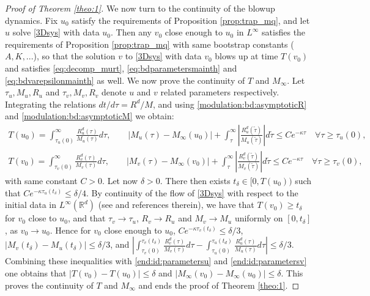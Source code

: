 \documentclass[11pt]{aims}
\theoremstyle{definition}
\numberwithin{equation}{section}
\begin{document}
\begin{proof}[Proof of Theorem \ref{theo:1}]
We now turn to the continuity of the blowup dynamics. Fix $u_0$ satisfy the requirements of Proposition \ref{prop:trap_mq}, and let $u$ solve \eqref{3Dsys} with data $u_0$. Then any $v_0$ close enough to $u_0$ in $L^\infty$ satisfies the requirements of Proposition \ref{prop:trap_mq} with same bootstrap constants ($A,K,...$), so that the solution $v$ to \eqref{3Dsys} with data $v_0$ blows up at time $T(v_0)$ and satisfies \eqref{eq:decomp_murt}, \eqref{eq:bdparametersmainth} and \eqref{eq:bdvarepsilonmainth} as well. We now prove the continuity of $T$ and $M_\infty$. Let $\tau_u,M_u,R_u$ and $\tau_v,M_v,R_v$ denote $u$ and $v$ related parameters respectively. Integrating the relations $dt/d\tau=R^d/M$, and using \eqref{modulation:bd:asymptoticR} and \eqref{modulation:bd:asymptoticM} we obtain:
\begin{align}
\label{end:id:parametersu} T(u_0)=\int_{\tau_u(0)}^\infty \frac{R^d_u(\tau)}{M_u(\tau)}d\tau, \qquad |M_u(\tau)-M_\infty(u_0)|+\int_{\tau}^\infty \left|\frac{R^d_u(\tilde \tau)}{M_u(\tilde \tau)}\right|d\tilde \tau \leq Ce^{-\kappa \tau} \quad \forall \tau\geq \tau_u(0),\\
\label{end:id:parametersv} T(v_0)=\int_{\tau_v(0)}^\infty \frac{R^d_v(\tau)}{M_v(\tau)}d\tau, \qquad |M_v(\tau)-M_\infty(v_0)|+\int_{\tau}^\infty \left|\frac{R^d_v(\tilde \tau)}{M_v(\tilde \tau)}\right|d\tilde \tau\leq Ce^{-\kappa \tau} \quad \forall \tau\geq \tau_v(0),
\end{align}
with same constant $C>0$. Let now $\delta>0$. There then exists $t_\delta\in [0,T(u_0))$ such that $Ce^{-\kappa \tau_u(t_\delta)}\leq \delta/4$. By continuity of the flow of \eqref{3Dsys} with respect to the initial data in $L^\infty(\mathbb R^d)$ (see \cite{B} and references therein), we have that $T(v_0)\geq t_\delta$ for $v_0$ close to $u_0$, and that $\tau_v\to \tau_u$, $R_v\to R_u$ and $M_v\to M_u$ uniformly on $[0,t_\delta]$, as $v_0\to u_0$. Hence for $v_0$ close enough to $u_0$, $Ce^{-\kappa \tau_v(t_\delta)}\leq \delta/3$, $|M_v(t_\delta)-M_u(t_\delta)|\leq \delta/3$, and $|\int_{\tau_v(0)}^{\tau_v(t_\delta)} \frac{R^d_v(\tau)}{M_v(\tau)}d\tau- \int_{\tau_u(0)}^{\tau_u(t_d)} \frac{R^d_u(\tau)}{M_u(\tau)}d\tau|\leq \delta/3$. Combining these inequalities with \eqref{end:id:parametersu} and \eqref{end:id:parametersv} one obtains that $|T(v_0)-T(u_0)|\leq \delta$ and $|M_\infty(v_0)-M_\infty(u_0)|\leq \delta$. This proves the continuity of $T$ and $M_\infty$ and ends the proof of Theorem \ref{theo:1}.
\end{proof}
\end{document}
